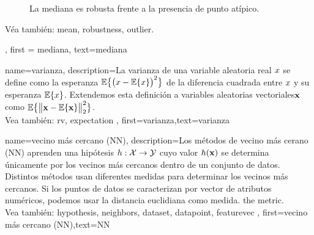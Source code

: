 {{\begin{figure}[H]
		\caption{La mediana es robusta frente a la presencia de punto atípico.}
	\end{figure}
	Véa también: \gls{mean}, \gls{robustness}, \gls{outlier}.}, 
	first = {mediana}, 
	text={mediana} 
}


{
	name={varianza},
	description={La varianza de una variable aleatoria real $x$ se define como la esperanza
		$\mathbb{E}\big\{ \big( x - \mathbb{E}\{x \} \big)^{2} \big\}$ de la diferencia cuadrada entre $x$ 
		y su esperanza $\mathbb{E}\{x \}$. Extendemos esta definición a variables aleatorias vectoriales${\bf x}$ 
		como $\mathbb{E}\big\{ \big\| {\bf x} - \mathbb{E}\{{\bf x} \} \big\|_{2}^{2} \big\}$.
		\\
		Vea también: \gls{rv}, \gls{expectation} } ,
		first={varianza},text={varianza} 
}

{
	name={vecino más cercano (NN)},
	description={Los métodos de vecino más cerano (NN) aprenden una hipótesis
		$h: \mathcal{X} \rightarrow \mathcal{Y}$ cuyo valor $h({\bf x})$ 
		se determina únicamente por los vecinos más cercanos dentro de un conjunto de datos. Distintos 
		métodos usan diferentes medidas para determinar los vecinos más cercanos. Si los puntos de datos
		se caracterizan por vector de atributos numéricos, podemos usar la distancia euclidiana como medida.  
		the metric.
		\\
		Vea también: \gls{hypothesis}, \gls{neighbors}, \gls{dataset}, \gls{datapoint}, \gls{featurevec} },
	first={vecino más cercano (NN)},text={NN} 
}

